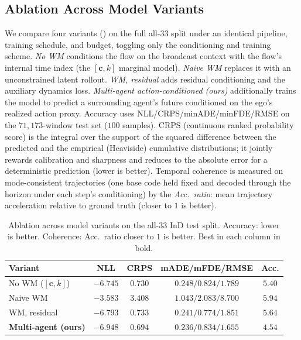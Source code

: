 \documentclass[journal]{IEEEtran}
\begin{document}
\subsection{Ablation Across Model Variants}\label{sec:results_ablation}
We compare four variants () on the full all-33 split under an identical pipeline, training schedule, and budget, toggling only the conditioning and training scheme. \emph{No WM} conditions the flow on the broadcast context with the flow's internal time index (the $[\mathbf{c},k]$ marginal model). \emph{Naive WM} replaces it with an unconstrained latent rollout. \emph{WM, residual} adds residual conditioning and the auxiliary dynamics loss. \emph{Multi-agent action-conditioned (ours)} additionally trains the model to predict a surrounding agent's future conditioned on the ego's realized action proxy. Accuracy uses NLL/CRPS/minADE/minFDE/RMSE on the $71{,}173$-window test set ($100$ samples). CRPS (continuous ranked probability score) is the integral over the support of the squared difference between the predicted and the empirical (Heaviside) cumulative distributions; it jointly rewards calibration and sharpness and reduces to the absolute error for a deterministic prediction (lower is better). Temporal coherence is measured on mode-consistent trajectories (one base code held fixed and decoded through the horizon under each step's conditioning) by the \emph{Acc.\ ratio}: mean trajectory acceleration relative to ground truth (closer to $1$ is better).

\begin{table}[h]
\caption{Ablation across model variants on the all-33 InD test split. Accuracy: lower is better. Coherence: Acc.\ ratio closer to $1$ is better. Best in each column in bold.}
\label{tab:ablation}
\centering
\footnotesize
\setlength{\tabcolsep}{3pt}
\begin{tabular}{l c c c c}
\toprule
\textbf{Variant} & \textbf{NLL} & \textbf{CRPS} & \textbf{mADE/mFDE/RMSE} & \textbf{Acc.} \\
\midrule
No WM ($[\mathbf{c},k]$)        & $-6.745$ & $0.730$ & $0.248/0.824/1.789$ & $5.40$ \\
Naive WM                        & $-3.583$ & $3.408$ & $1.043/2.083/8.700$ & $5.94$ \\
WM, residual                    & $-6.793$ & $0.733$ & $0.241/0.774/1.851$ & $5.64$ \\
\textbf{Multi-agent (ours)}     & $\mathbf{-6.948}$ & $\mathbf{0.694}$ & $\mathbf{0.236/0.834/1.655}$ & $\mathbf{4.54}$ \\
\bottomrule
\end{tabular}
\end{table}
\end{document}
